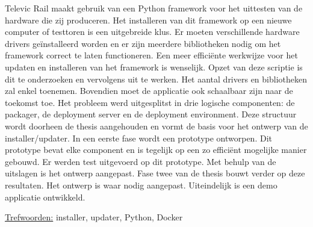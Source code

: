 Televic Rail maakt gebruik van een Python framework voor het uittesten van de hardware die zij produceren.
Het installeren van dit framework op een nieuwe computer of testtoren is een uitgebreide klus.
Er moeten verschillende hardware drivers geïnstalleerd worden en er zijn meerdere bibliotheken nodig om het framework correct te laten functioneren.
Een meer efficiënte werkwijze voor het updaten en installeren van het framework is wenselijk.
Opzet van deze scriptie is dit te onderzoeken en vervolgens uit te werken.
Het aantal drivers en bibliotheken zal enkel toenemen.
Bovendien moet de applicatie ook schaalbaar zijn naar de toekomst toe.
%
Het probleem werd uitgesplitst in drie logische componenten: de packager, de deployment server en de deployment environment.
Deze structuur wordt doorheen de thesis aangehouden en vormt de basis voor het ontwerp van de installer/updater.
In een eerste fase wordt een prototype ontworpen.
Dit prototype bevat elke component en is tegelijk op een zo efficiënt mogelijke manier gebouwd.
Er werden test uitgevoerd op dit prototype.
Met behulp van de uitslagen is het ontwerp aangepast.
Fase twee van de thesis bouwt verder op deze resultaten.
Het ontwerp is waar nodig aangepast.
Uiteindelijk is een demo applicatie ontwikkeld.

\underline{Trefwoorden:} installer, updater, Python, Docker